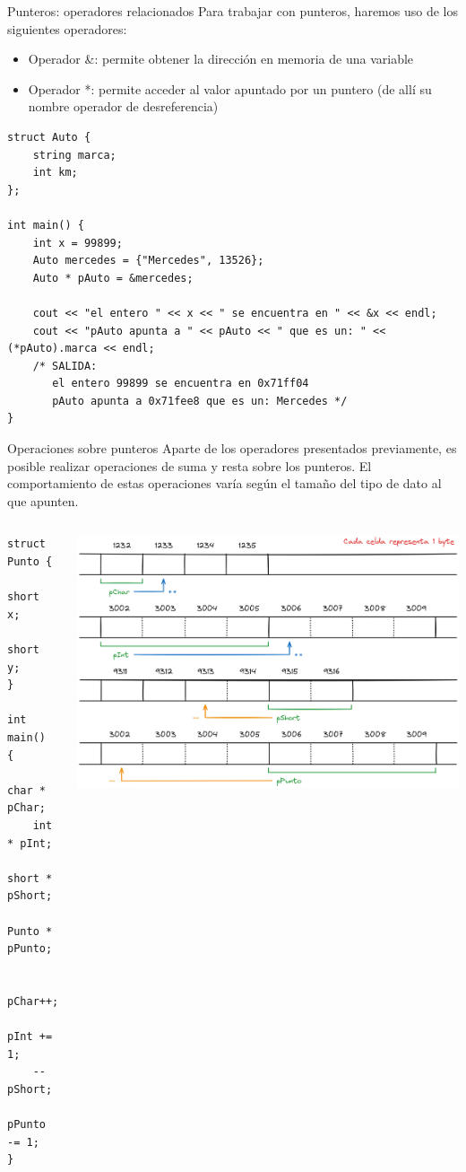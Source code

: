 \documentclass[12pt]{beamer}
\begin{document}
\begin{frame}[fragile]{Punteros: operadores relacionados}
    Para trabajar con punteros, haremos uso de los siguientes operadores:
    \begin{itemize}
        \item Operador \alert{\&}: permite obtener la dirección en memoria de una variable
        \item Operador \alert{*}: permite acceder al valor apuntado por un puntero (de allí su nombre operador de desreferencia)
    \end{itemize}
\begin{lstlisting}[basicstyle=\tiny]
struct Auto {
	string marca;
	int km;
};

int main() {
	int x = 99899;
	Auto mercedes = {"Mercedes", 13526};
	Auto * pAuto = &mercedes;
	
	cout << "el entero " << x << " se encuentra en " << &x << endl;
	cout << "pAuto apunta a " << pAuto << " que es un: " << (*pAuto).marca << endl;
	/* SALIDA:
	   el entero 99899 se encuentra en 0x71ff04
	   pAuto apunta a 0x71fee8 que es un: Mercedes */
}
\end{lstlisting}
\end{frame}

\begin{frame}[fragile]{Operaciones sobre punteros}
    Aparte de los operadores presentados previamente, es posible realizar operaciones de suma y resta sobre los punteros. 
    El comportamiento de estas operaciones varía según el \alert{tamaño del tipo de dato} al que apunten. \\
    \begin{columns}
        \begin{lstlisting}[basicstyle=\tiny]
struct Punto {
    short x;
    short y;
}

int main() {
    char * pChar;
    int * pInt;
    short * pShort;
    Punto * pPunto;
    
    pChar++;
    pInt += 1;
    --pShort;
    pPunto -= 1;
}
\end{lstlisting}
    \includegraphics[width=\textwidth]{punteros_suma_resta.png}
    \end{columns}
\end{frame}
\end{document}
